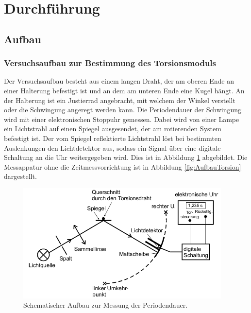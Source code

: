  \section{Durchführung}
\label{sec:Durchführung}


\subsection{Aufbau}


\subsubsection{Versuchsaufbau zur Bestimmung des Torsionsmoduls}
\label{sec:AufbauTorsion}

Der Versuchsaufbau besteht aus einem langen Draht, der am oberen Ende an einer
Halterung befestigt ist und an dem am unteren Ende eine Kugel hängt.
An der Halterung ist ein Justierrad angebracht, mit welchem der Winkel
verstellt oder die Schwingung angeregt werden kann.
Die Periodendauer der Schwingung wird mit einer elektronischen Stoppuhr
gemessen. Dabei wird von einer Lampe ein Lichtstrahl auf einen
Spiegel ausgesendet, der am rotierenden System befestigt ist.
Der vom Spiegel reflektierte Lichtstrahl löst bei
bestimmten Auslenkungen den Lichtdetektor aus, sodass ein Signal über eine
digitale Schaltung an die Uhr weitergegeben wird.
Dies ist in Abbildung \ref{fig:AufbauPeriode} abgebildet.
Die Messappatur ohne die Zeitmessvorrichtung ist in Abbildung
\ref{fig:AufbauTorsion} dargestellt.

\begin{figure}
  \centering
  \includegraphics[height=6cm]{Zeitmessung.png}
  \caption{Schematischer Aufbau zur Messung der Periodendauer.}
  \label{fig:AufbauPeriode}
\end{figure}


